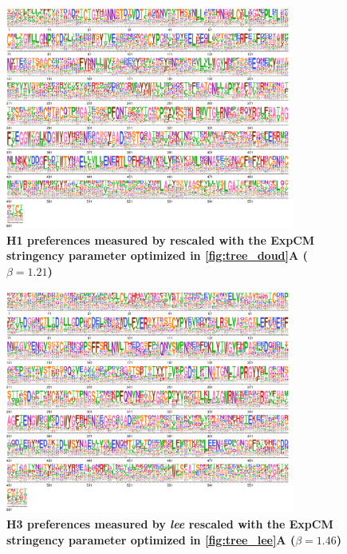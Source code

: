 \documentclass[11pt]{article}
\begin{document}
\begin{figure}
\centerline{\includegraphics[width=0.85\textwidth]{figures/prefs_doud}}
\caption{\label{fig:prefs_doud}
\textbf{H1 preferences measured by \cite{doud2016accurate} rescaled with the ExpCM stringency parameter optimized in \ref{fig:tree_doud}A  ($\beta = 1.21$)} 
}
\end{figure}

\begin{figure}
\centerline{\includegraphics[width=0.85\textwidth]{figures/prefs_lee}}
\caption{\label{fig:prefs_lee}
\textbf{H3 preferences measured by \textit{lee} rescaled with the ExpCM stringency parameter optimized in \ref{fig:tree_lee}A  ($\beta = 1.46$)} 
}
\end{figure}
\end{document}
